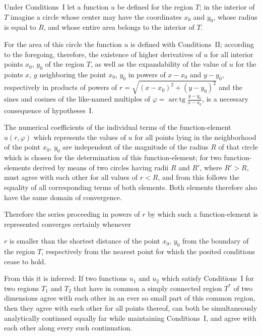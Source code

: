 \documentclass{article}
\begin{document}
Under Conditions~I let a function $u$ be defined for the region $T$; in the interior of $T$ imagine a circle whose center may have the coordinates $x_0$ and $y_0$, whose radius is equal to $R$, and whose entire area belongs to the interior of $T$.



For the area of this circle the function $u$ is defined with Conditions~II; according to the foregoing, therefore, the existence of higher derivatives of $u$ for all interior points $x_0$, $y_0$ of the region $T$, as well as the expandability of the value of $u$ for the points $x$, $y$ neighboring the point $x_0$, $y_0$ in powers of $x - x_0$ and $y - y_0$, respectively in products of powers of $r = \sqrt{(x - x_0)^2 + (y - y_0)^2}$ and the sines and cosines of the like-named multiples of $\varphi = \operatorname{arc\,tg}\frac{y - y_0}{x - x_0}$, is a necessary consequence of hypotheses~I.



The numerical coefficients of the individual terms of the function-element $u(r, \varphi)$ which represents the values of $u$ for all points lying in the neighborhood of the point $x_0$, $y_0$ are independent of the magnitude of the radius $R$ of that circle which is chosen for the determination of this function-element; for two function-elements derived by means of two circles having radii $R$ and $R'$, where $R' > R$, must agree with each other for all values of $r < R$, and from this follows the equality of all corresponding terms of both elements. Both elements therefore also have the same domain of convergence.



Therefore the series proceeding in powers of $r$ by which such a function-element is represented converges certainly whenever




$r$ is smaller than the shortest distance of the point $x_0$, $y_0$ from the boundary of the region $T$, respectively from the nearest point for which the posited conditions cease to hold.



From this it is inferred: If two functions $u_1$ and $u_2$ which satisfy Conditions~I for two regions $T_1$ and $T_2$ that have in common a simply connected region $T^*$ of two dimensions agree with each other in an ever so small part of this common region, then they agree with each other for all points thereof, can both be simultaneously analytically continued equally far while maintaining Conditions~I, and agree with each other along every such continuation.
\end{document}
